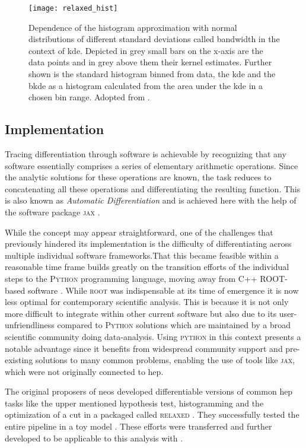 \begin{figure}
    \centering
    \texttt{[image: relaxed\_hist]}
    \caption[]{Dependence of the histogram approximation with normal distributions of different standard deviations called bandwidth in the context of \ac{kde}. Depicted in grey small bars on the x-axis are the data points and in grey above them their kernel estimates. Further shown is the standard histogram binned from data, the \ac{kde} and the \ac{bkde} as a histogram calculated from the area under the \ac{kde} in a chosen bin range. Adopted from \citep{Simpson_2023}.}
    \label{fig:relaxed_hist}
\end{figure}


\subsection{Implementation}
Tracing differentiation through software is achievable by recognizing that any software essentially comprises a series of elementary arithmetic operations. Since the analytic solutions for these operations are known, the task reduces to concatenating all these operations and differentiating the resulting function. This is also known as \textit{Automatic Differentiation} and is achieved here with the help of the software package \textsc{jax} \citep{jax2018github}.

While the concept may appear straightforward, one of the challenges that previously hindered its implementation is the difficulty of differentiating across multiple individual software frameworks.That this became feasible within a reasonable time frame builds greatly on the transition efforts  of the individual steps to the \textsc{Python} programming language, moving away from C++ \textsc{ROOT}-based software \citep{ANTCHEVA20092499}. While \textsc{root} was indispensable at its time of emergence it is now less optimal for contemporary scientific analysis. This is because it is not only more difficult to integrate within other current software but also due to its user-unfriendliness compared to \textsc{Python} solutions which are maintained by a broad scientific community doing data-analysis. Using \textsc{python} in this context presents a notable advantage since it benefits from widespread community support and pre-existing solutions to many common problems, enabling the use of tools like \textsc{jax}, which were not originally connected to \ac{hep}.


The original proposers \citet{Simpson_2023} of \ac{neos} developed differentiable versions of common \ac{hep} tasks like the upper mentioned hypothesis test, histogramming and the optimization of a cut in a packaged called \textsc{relaxed} \citep{Simpson_relaxed_version_0_3_0_2023}. They successfully tested the entire pipeline in a toy model \citep{Simpson_neos_version_0_2_0_2021}. These efforts were transferred and further developed to be applicable to this analysis with \citep{hh_neos}. 


